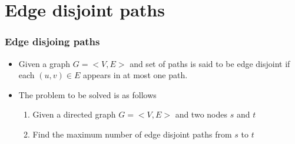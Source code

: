 \documentclass{beamer}
\begin{document}
\section{Edge disjoint paths}
\begin{frame}
  \frametitle{Edge disjoing paths}
\begin{itemize}
  \item Given a graph $G=<V,E>$ and set of paths is said to be edge disjoint if each $(u,v)\in E$ appears in at most one path.
  \item The problem to be solved is as follows
  \begin{enumerate}
    \item Given a directed graph $G=<V,E>$ and two nodes $s$ and $t$
    \item Find the maximum number of edge disjoint paths from $s$ to $t$
  \end{enumerate}
\end{itemize}
  

\end{frame}
\end{document}
